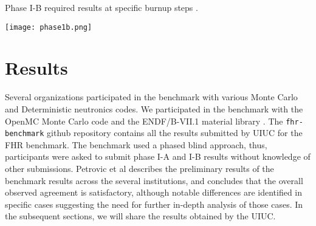 \begin{table}
    \centering
    \caption{Phase I-B required results at specific burnup steps \cite{noauthor_fluoride_nodate}.}
    \label{tab:phase1b}
    \texttt{[image: phase1b.png]}
  \end{table}

\section{Results}
Several organizations participated in the benchmark with various Monte Carlo
and Deterministic neutronics codes. 
We participated in the benchmark with the OpenMC Monte Carlo code 
\cite{romano_openmc_2013} and the ENDF/B-VII.1 material library 
\cite{chadwick_endf/b-vii.1_2011}.
The \texttt{fhr-benchmark} github repository contains all the results submitted 
by \gls{UIUC} for the \gls{FHR} benchmark. 
The benchmark used a phased blind approach, thus, participants were asked to 
submit phase I-A and I-B results without knowledge of other submissions. 
Petrovic et al describes the preliminary results of the benchmark results 
across the several institutions, and concludes that the overall observed agreement 
is satisfactory, although notable differences are identified in specific cases 
suggesting the need for further in-depth analysis of those cases. 
In the subsequent sections, we will share the results obtained by the \gls{UIUC}.  

